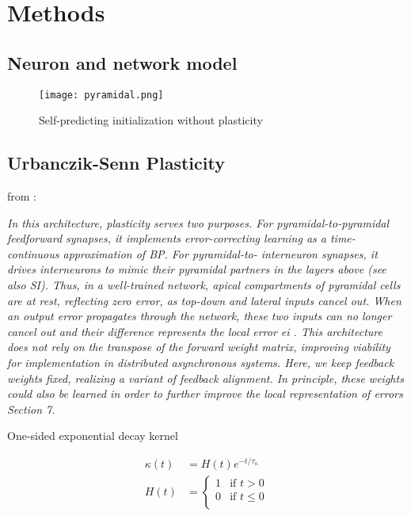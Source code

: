 
\chapter{Methods}




\section{Neuron and network model}

\begin{figure}
  \centerline{\texttt{[image: pyramidal.png]}}
  \caption{Self-predicting initialization without plasticity}
\end{figure}
\section{Urbanczik-Senn Plasticity}


from \cite{Haider2021}:

\textit{In this architecture, plasticity serves two purposes. For pyramidal-to-pyramidal feedforward synapses,
  it implements error-correcting learning as a time-continuous approximation of BP. For pyramidal-to-
  interneuron synapses, it drives interneurons to mimic their pyramidal partners in the layers above (see
  also SI). Thus, in a well-trained network, apical compartments of pyramidal cells are at rest, reflecting
  zero error, as top-down and lateral inputs cancel out. When an output error propagates through the
  network, these two inputs can no longer cancel out and their difference represents the local error ei .
  This architecture does not rely on the transpose of the forward weight matrix, improving viability for
  implementation in distributed asynchronous systems. Here, we keep feedback weights fixed, realizing
  a variant of feedback alignment. In principle, these weights could also be learned in order to further
  improve the local representation of errors Section 7.}




One-sided exponential decay kernel

\begin{align}
  \kappa(t) & = H(t)e^{-t/\tau_{\kappa}} \\
  H(t)      & =
  \begin{cases}
    1 & \text{if $t > 0$}    \\
    0 & \text{if $t \leq 0$} \\
  \end{cases}
\end{align}


